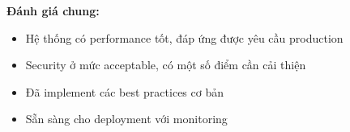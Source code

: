 \textbf{Đánh giá chung:}
\begin{itemize}
    \item Hệ thống có performance tốt, đáp ứng được yêu cầu production
    \item Security ở mức acceptable, có một số điểm cần cải thiện
    \item Đã implement các best practices cơ bản
    \item Sẵn sàng cho deployment với monitoring
\end{itemize}
